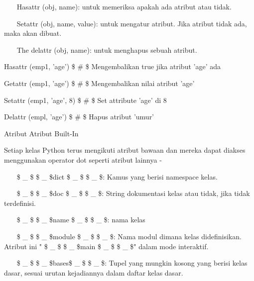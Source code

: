 \noindent 
~~~ Hasattr (obj, name): untuk memeriksa apakah ada atribut atau tidak. \par
\vspace{12pt}
\noindent 
~~~ Setattr (obj, name, value): untuk mengatur atribut. Jika atribut tidak ada, maka akan dibuat. \par
\vspace{12pt}
\noindent 
~~~ The delattr (obj, name): untuk menghapus sebuah atribut. \par
\vspace{12pt}
\noindent 
Hasattr (emp1, 'age')  \$  \#  \$ Mengembalikan true jika atribut 'age' ada \par
\noindent 
Getattr (emp1, 'age')  \$  \#  \$ Mengembalikan nilai atribut 'age' \par
\noindent 
Setattr (emp1, 'age', 8)  \$  \#  \$ Set attribute 'age' di 8 \par
\noindent 
Delattr (empl, 'age')  \$  \#  \$ Hapus atribut 'umur' \par
\vspace{12pt}
\noindent 
Atribut Atribut Built-In \par
\vspace{12pt}
\noindent 
Setiap kelas Python terus mengikuti atribut bawaan dan mereka dapat diakses menggunakan operator dot seperti atribut lainnya - \par
\vspace{12pt}
\noindent 
~~~  \$  \_  \$ \$  \_  \$dict \$  \_  \$ \$  \_  \$: Kamus yang berisi namespace kelas. \par
\vspace{12pt}
\noindent 
~~~  \$  \_  \$ \$  \_  \$doc \$  \_  \$ \$  \_  \$: String dokumentasi kelas atau tidak, jika tidak terdefinisi. \par
\vspace{12pt}
\noindent 
~~~  \$  \_  \$ \$  \_  \$name \$  \_  \$ \$  \_  \$: nama kelas \par
\vspace{12pt}
\noindent 
~~~  \$  \_  \$ \$  \_  \$module \$  \_  \$ \$  \_  \$: Nama modul dimana kelas didefinisikan. Atribut ini " \$  \_  \$ \$  \_  \$main \$  \_  \$ \$  \_  \$" dalam mode interaktif. \par
\vspace{12pt}
\noindent 
~~~  \$  \_  \$ \$  \_  \$bases\$  \_  \$ \$  \_  \$: Tupel yang mungkin kosong yang berisi kelas dasar, sesuai urutan kejadiannya dalam daftar kelas dasar. \par
\vspace{12pt}
